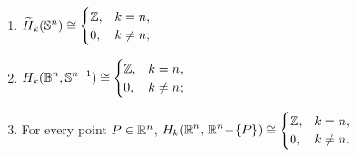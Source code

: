 \begin{proposition}\label{prop:Sn-Bn-Rn}
\begin{enumerate}
\item[(a)] $\displaystyle \widetilde H_k(\mathbb{S}^n)\cong
\begin{cases}
\Bbb Z,& k=n,\\
0,& k\ne n;
\end{cases}$
\smallskip
\item[(b)] $\displaystyle H_k(\mathbb{B}^n,\mathbb{S}^{n-1})\cong
\begin{cases}
\Bbb Z,& k=n,\\
0,& k\ne n;
\end{cases}$
\smallskip
\item[(c)] For every point $P\in\Bbb R^n$, 
$\displaystyle H_k(\Bbb R^n,\,\Bbb R^n\!-\!\{P\})\cong
\begin{cases}
\Bbb Z,& k=n,\\
0,& k\ne n.
\end{cases}$
\end{enumerate}
\end{proposition}

